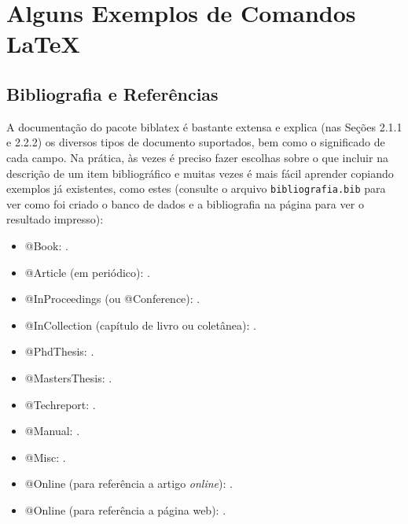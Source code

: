 \chapter{Alguns Exemplos de Comandos \LaTeX{}}
\label{chap:exemplos}

\section{Bibliografia e Referências}

A documentação do pacote biblatex \citep{biblatex} é
bastante extensa e explica (nas Seções 2.1.1 e 2.2.2) os diversos
tipos de documento suportados, bem como o significado de cada campo.
Na prática, às vezes é preciso fazer escolhas sobre
o que incluir na descrição de um item bibliográfico e muitas vezes
é mais fácil aprender copiando exemplos já existentes, como estes (consulte o
arquivo \texttt{bibliografia.bib} para ver como foi criado o banco de dados e a
bibliografia na página \pageref{bibliografia} para ver o resultado impresso):

\begin{multicols}{2}
  \begin{itemize}
    \item @Book: \cite{Knuth:96}.

    \item @Article (em periódico): \cite{MenaChalco08}.

    \item @InProceedings (ou @Conference): \cite{alves03:simi}.

    \item @InCollection (capítulo de livro ou coletânea): \cite{bobaoglu93:concepts}.

    \item @PhdThesis: \cite{garcia01:PhD}.

    \item @MastersThesis: \cite{schmidt03:MSc}.

    \item @Techreport: \cite{alvisi99:analysisCIC}.

    \item @Manual: \cite{biblatex}.

    \item @Misc: \cite{gridftp}.

    \item @Online (para referência a artigo \emph{online}): \cite{fowler04:designDead}.

    \item @Online (para referência a página web): \cite{FSF:GNU-GPL}.
  \end{itemize}
\end{multicols}

